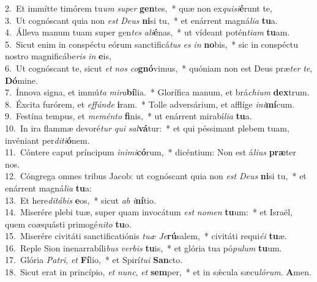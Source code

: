 {2.~}Et immítte timórem tu\textit{um} \textit{su}\textit{per} \textbf{gen}tes,~* quæ non ex\textit{qui}\textit{si}\textbf{é}runt te,\\
{3.~}Ut cognóscant quia non \textit{est} \textit{De}\textit{us} \textbf{ni}si tu,~* et enárrent magná\textit{li}\textit{a} \textbf{tu}a.\\
{4.~}Álleva manum tuam super gen\textit{tes} \textit{a}\textit{li}\textbf{é}nas,~* ut vídeant potén\textit{ti}\textit{am} \textbf{tu}am.\\
{5.~}Sicut enim in conspéctu eórum sanctificá\textit{tus} \textit{es} \textit{in} \textbf{no}bis,~* sic in conspéctu nostro magnificábe\textit{ris} \textit{in} \textbf{e}is,\\
{6.~}Ut cognóscant te, sicut \textit{et} \textit{nos} \textit{co}\textbf{gnó}vimus,~* quóniam non est Deus præ\textit{ter} \textit{te}, \textbf{Dó}mine.\\
{7.~}Ínnova signa, et immú\textit{ta} \textit{mi}\textit{ra}\textbf{bí}lia.~* Glorífica manum, et brá\textit{chi}\textit{um} \textbf{dex}trum.\\
{8.~}Éxcita furórem, et \textit{ef}\textit{fún}\textit{de} \textbf{i}ram.~* Tolle adversárium, et afflíge \textit{i}\textit{ni}\textbf{mí}cum.\\
{9.~}Festína tempus, et \textit{me}\textit{mén}\textit{to} \textbf{fi}nis,~* ut enárrent mirabí\textit{li}\textit{a} \textbf{tu}a.\\
{10.~}In ira flammæ devoré\textit{tur} \textit{qui} \textit{sal}\textbf{vá}tur:~* et qui péssimant plebem tuam, invéniant per\textit{di}\textit{ti}\textbf{ó}nem.\\
{11.~}Cóntere caput príncipum \textit{i}\textit{ni}\textit{mi}\textbf{có}rum,~* dicéntium: Non est á\textit{li}\textit{us} \textbf{præ}ter nos.\\
{12.~}Cóngrega omnes tribus Jacob: ut cognóscant quia non \textit{est} \textit{De}\textit{us} \textbf{ni}si tu,~* et enárrent magná\textit{li}\textit{a} \textbf{tu}a:\\
{13.~}Et here\textit{di}\textit{tá}\textit{bis} \textbf{e}os,~* sicut \textit{ab} \textit{i}\textbf{ní}tio.\\
{14.~}Miserére plebi tuæ, super quam invocátum \textit{est} \textit{no}\textit{men} \textbf{tu}um:~* et Israël, quem coæquásti primogé\textit{ni}\textit{to} \textbf{tu}o.\\
{15.~}Miserére civitáti sanctificatiónis \textit{tu}\textit{æ} \textit{Je}\textbf{rú}salem,~* civitáti requi\textit{é}\textit{i} \textbf{tu}æ.\\
{16.~}Reple Sion inenarrabíli\textit{bus} \textit{ver}\textit{bis} \textbf{tu}is,~* et glória tua pó\textit{pu}\textit{lum} \textbf{tu}um.\\
{17.~}Glória \textit{Pa}\textit{tri}, \textit{et} \textbf{Fí}lio,~* et Spirí\textit{tu}\textit{i} \textbf{San}cto.\\
{18.~}Sicut erat in princípio, \textit{et} \textit{nunc}, \textit{et} \textbf{sem}per,~* et in sǽcula sæcu\textit{ló}\textit{rum}. \textbf{A}men.\\

